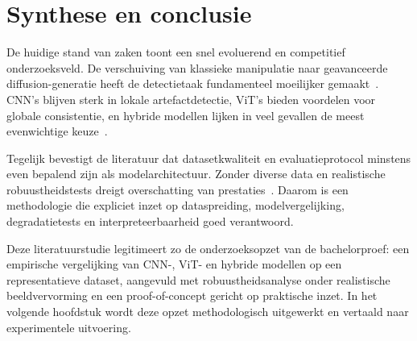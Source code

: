 \section{Synthese en conclusie}
De huidige stand van zaken toont een snel evoluerend en competitief onderzoeksveld. De verschuiving van klassieke manipulatie naar geavanceerde diffusion-generatie heeft de detectietaak fundamenteel moeilijker gemaakt~\autocite{TowardsDiffusion2024,Hasan2026}. CNN's blijven sterk in lokale artefactdetectie, ViT's bieden voordelen voor globale consistentie, en hybride modellen lijken in veel gevallen de meest evenwichtige keuze~\autocite{CNNViTCompare2026,CompressionHybrid2025}. 

Tegelijk bevestigt de literatuur dat datasetkwaliteit en evaluatieprotocol minstens even bepalend zijn als modelarchitectuur. Zonder diverse data en realistische robuustheidstests dreigt overschatting van prestaties~\autocite{Pei2024,EvaluationModels2025}. Daarom is een methodologie die expliciet inzet op dataspreiding, modelvergelijking, degradatietests en interpreteerbaarheid goed verantwoord.

Deze literatuurstudie legitimeert zo de onderzoeksopzet van de bachelorproef: een empirische vergelijking van CNN-, ViT- en hybride modellen op een representatieve dataset, aangevuld met robuustheidsanalyse onder realistische beeldvervorming en een proof-of-concept gericht op praktische inzet. In het volgende hoofdstuk wordt deze opzet methodologisch uitgewerkt en vertaald naar experimentele uitvoering.


